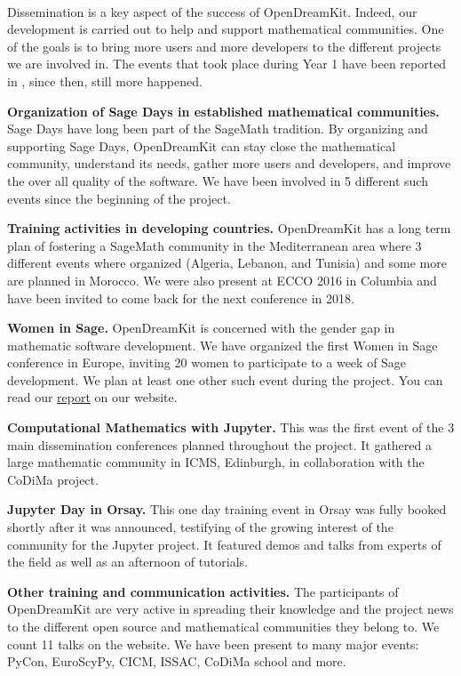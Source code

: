 \documentclass{deliverablereport}
\begin{document}
\paragraph{}

Dissemination is a key aspect of the success of OpenDreamKit. Indeed, our development is carried
out to help and support mathematical communities. One of the goals is to bring
more users and more developers to the different projects we are involved in. The events
that took place during Year 1 have been reported in , since then, still
more happened.

\begin{compactitem}
\item \textbf{Organization of Sage Days in established mathematical communities.} Sage Days have long been
part of the SageMath tradition. By organizing and supporting Sage Days, OpenDreamKit can stay close
the mathematical community, understand its needs, gather more users and developers, and improve
the over all quality of the software. We have been involved in 5 different such events since the beginning 
of the project.
\item \textbf{Training activities in developing countries.} OpenDreamKit has a long term plan of fostering
a SageMath community in the Mediterranean area where 3 different events where organized (Algeria, Lebanon, and Tunisia) 
and some more are planned in Morocco. We were also present at ECCO 2016 in Columbia and have been invited
to come back for the next conference in 2018. 
\item \textbf{Women in Sage.} OpenDreamKit is concerned with the gender gap in mathematic software development. 
We have organized the first Women in Sage conference in Europe, inviting 20 women to participate to a week of Sage development. We plan at least one other such event during the project. You can read our \href{http://opendreamkit.org/2017/04/06/WomenInSage/}{report} on our website.
\item \textbf{Computational Mathematics with Jupyter.} This was the first event of the 3 main dissemination conferences
planned throughout the project. It gathered a large mathematic community in ICMS, Edinburgh, in collaboration with the CoDiMa project.
\item \textbf{Jupyter Day in Orsay.} This one day training event in Orsay was fully booked shortly after it was announced, testifying of the growing interest of the community for the Jupyter project. It featured demos and talks from experts of the field as well as an afternoon of tutorials. 
\item \textbf{Other training and communication activities.} The participants of OpenDreamKit are very active
in spreading their knowledge and the project news to the different open source
and mathematical communities they belong to. We count 11 talks on the
website. We have been present to many major events: PyCon, EuroScyPy, CICM, ISSAC, CoDiMa school and more. 
\end{compactitem}
\end{document}
